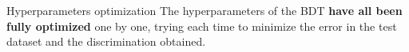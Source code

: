 \documentclass[8pt]{beamer}
\begin{document}
\begin{frame}{Hyperparameters optimization}
\justifying
The hyperparameters of the BDT \textbf{have all been fully optimized} one by one, trying each time to minimize the error in the test dataset and the discrimination obtained. \vfill

\begin{columns}
		\begin{column}{0.59\textwidth}
		\begin{table}
\begin{center}
\end{center}
\end{table}
		\end{column} 
		\end{columns} \vfill
		
%
\end{frame}
\end{document}
